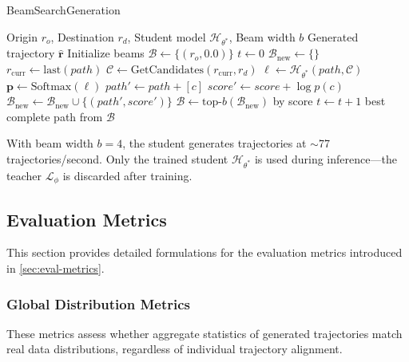 \begin{algorithm}[H]
    \caption{BeamSearchGeneration}
    \label{alg:beam-search-appendix}
    \begin{algorithmic}
        \Require Origin $r_o$, Destination $r_d$, Student model $\mathcal{H}_{\theta^*}$, Beam width $b$
        \Ensure Generated trajectory $\hat{\mathbf{r}}$
        \State Initialize beams $\mathcal{B} \gets \{(r_o, 0.0)\}$ 
        \State $t \gets 0$
        \State $\mathcal{B}_{\text{new}} \gets \{\}$
        \State $r_{\text{curr}} \gets \text{last}(path)$
        \State $\mathcal{C} \gets \text{GetCandidates}(r_{\text{curr}}, r_d)$ 
        \State $\boldsymbol{\ell} \gets \mathcal{H}_{\theta^*}(path, \mathcal{C})$ 
        \State $\mathbf{p} \gets \text{Softmax}(\boldsymbol{\ell})$
        \State $path' \gets path + [c]$
        \State $score' \gets score + \log p(c)$
        \State $\mathcal{B}_{\text{new}} \gets \mathcal{B}_{\text{new}} \cup \{(path', score')\}$
        \EndFor
        \EndFor
        \State $\mathcal{B} \gets \text{top-}b(\mathcal{B}_{\text{new}})$ by score
        \State $t \gets t + 1$
        \EndWhile
        \State \Return best complete path from $\mathcal{B}$
    \end{algorithmic}
\end{algorithm}

With beam width $b=4$, the student generates trajectories at $\sim$77 trajectories/second. Only the trained student $\mathcal{H}_{\theta^*}$ is used during inference---the teacher $\mathcal{L}_\phi$ is discarded after training.

\subsection{Evaluation Metrics}
\label{app:metrics}

This section provides detailed formulations for the evaluation metrics introduced in \autoref{sec:eval-metrics}.

\subsubsection{Global Distribution Metrics}
\label{app:global-metrics}

These metrics assess whether aggregate statistics of generated trajectories match real data distributions, regardless of individual trajectory alignment.

